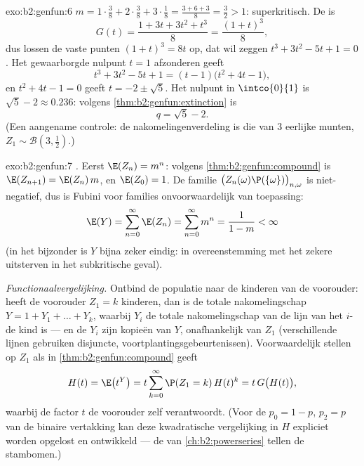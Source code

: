 \begin{solution}{exo:b2:genfun:6}
$m = 1\cdot\frac38 + 2\cdot\frac38 + 3\cdot\frac18 = \frac{3 + 6 +
3}{8} = \frac32 > 1$: superkritisch. De  is
\[
G(t) = \frac{1 + 3t + 3t^2 + t^3}{8} = \frac{(1 + t)^3}{8} ,
\]
dus lossen de vaste punten $(1 + t)^3 = 8t$ op, dat wil zeggen $t^3
+ 3t^2 - 5t + 1 = 0$. Het gewaarborgde nulpunt $t = 1$ afzonderen
geeft
\[
t^3 + 3t^2 - 5t + 1 = (t - 1)\bigl(t^2 + 4t - 1\bigr),
\]
en $t^2 + 4t - 1 = 0$ geeft $t = -2 \pm \sqrt5$. Het nulpunt in
$\intco{0}{1}$ is $\sqrt5 - 2 \approx 0.236$: volgens
\cref{thm:b2:genfun:extinction} is
\[
q = \sqrt 5 - 2 .
\]
(Een aangename controle: de nakomelingenverdeling is die van $3$
 eerlijke munten, $Z_1 \sim \mathcal{B}(3,
\frac12)$.)
\end{solution}

\begin{solution}{exo:b2:genfun:7}
\emph{.} Eerst $\E(Z_n) = m^n$: volgens
\cref{thm:b2:genfun:compound} is $\E(Z_{n+1}) = \E(Z_n)\,m$, en
$\E(Z_0) = 1$. De familie $\bigl(Z_n(\omega)\P(\{\omega\})
\bigr)_{n, \omega}$ is niet-negatief, dus is Fubini voor families
onvoorwaardelijk van toepassing:
\[
\E(Y) = \sum_{n=0}^{\infty}\E(Z_n)
= \sum_{n=0}^\infty m^n = \frac{1}{1 - m} < \infty
\]
(in het bijzonder is $Y$ bijna zeker eindig: in overeenstemming met
het zekere uitsterven in het subkritische geval).

\emph{Functionaalvergelijking.} Ontbind de populatie naar de
kinderen van de voorouder: heeft de voorouder $Z_1 = k$ kinderen,
dan is de totale nakomelingschap $Y = 1 + Y_1 + \dots + Y_k$,
waarbij $Y_i$ de totale nakomelingschap van de lijn van het $i$-de
kind is --- en de $Y_i$ zijn  kopieën van $Y$,
onafhankelijk van $Z_1$ (verschillende lijnen gebruiken disjuncte,
 voortplantingsgebeurtenissen). Voorwaardelijk
stellen op $Z_1$ als in \cref{thm:b2:genfun:compound} geeft
\[
H(t) = \E\bigl(t^Y\bigr)
= t\sum_{k=0}^\infty \P(Z_1 = k)\,H(t)^k
= t\,G\bigl(H(t)\bigr),
\]
waarbij de factor $t$ de voorouder zelf verantwoordt. (Voor de
 $p_0 = 1 - p$, $p_2 = p$ van de binaire vertakking kan
deze kwadratische vergelijking in $H$ expliciet worden opgelost en
ontwikkeld --- de  van \cref{ch:b2:powerseries}
tellen de stambomen.)
\end{solution}

